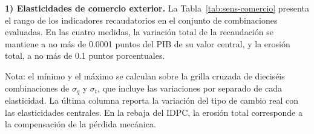 \documentclass[11pt]{article}
\begin{document}
\textbf{1) Elasticidades de comercio exterior.} La Tabla~\ref{tab:sens-comercio} presenta el rango de los indicadores recaudatorios en el conjunto de combinaciones evaluadas. En las cuatro medidas, la variación total de la recaudación se mantiene a no más de 0.0001 puntos del PIB de su valor central, y la erosión total, a no más de 0.1 puntos porcentuales.

\begin{table}[H]
\centering
\caption{Rango de los indicadores recaudatorios según las elasticidades de comercio exterior ($\sigma_{q}$ entre 1.4 y 3.8; $\sigma_{t}$ entre 0.6 y 3.0)}
\label{tab:sens-comercio}
\small
{}
\par\smallskip
\begin{minipage}{\textwidth}
\footnotesize Nota: el mínimo y el máximo se calculan sobre la grilla cruzada de dieciséis combinaciones de $\sigma_{q}$ y $\sigma_{t}$, que incluye las variaciones por separado de cada elasticidad. La última columna reporta la variación del tipo de cambio real con las elasticidades centrales. En la rebaja del IDPC, la erosión total corresponde a la compensación de la pérdida mecánica.
\end{minipage}
\end{table}
\end{document}
